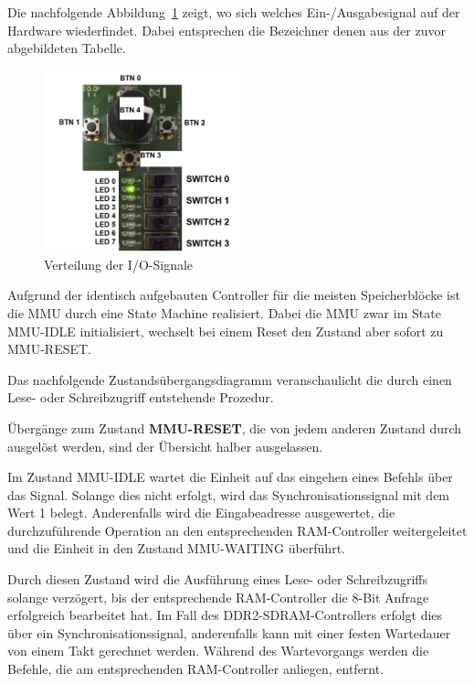 Die nachfolgende Abbildung~\ref{fig:pinning} zeigt, wo sich welches Ein-/Ausgabesignal auf der Hardware wiederfindet. Dabei entsprechen die Bezeichner denen aus der zuvor abgebildeten Tabelle.

\begin{figure}[H]
	\centering
		\includegraphics[width=0.5\textwidth]{pinning.png}
	\caption{Verteilung der I/O-Signale}
	\label{fig:pinning}
\end{figure}



Aufgrund der identisch aufgebauten Controller f\"ur die meisten Speicherbl\"ocke ist die MMU durch eine State Machine realisiert. Dabei die MMU zwar im State MMU-IDLE initialisiert, wechselt bei einem Reset den Zustand aber sofort zu MMU-RESET.

Das nachfolgende Zustands\"ubergangsdiagramm veranschaulicht die durch einen Lese- oder Schreibzugriff entstehende Prozedur.

{\"Uberg\"ange zum Zustand \textbf{MMU-RESET}, die von jedem anderen Zustand durch  ausgel\"ost werden, sind der \"Ubersicht halber ausgelassen.}


Im Zustand MMU-IDLE wartet die Einheit auf das eingehen eines Befehls \"uber das  Signal. Solange dies nicht erfolgt, wird das Synchronisationssignal  mit dem Wert 1 belegt. Anderenfalls wird die Eingabeadresse ausgewertet, die durchzuf\"uhrende Operation an den entsprechenden RAM-Controller weitergeleitet und die Einheit in den Zustand MMU-WAITING \"uberf\"uhrt.


Durch diesen Zustand wird die Ausf\"uhrung eines Lese- oder Schreibzugriffs solange verz\"ogert, bis der entsprechende RAM-Controller die 8-Bit Anfrage erfolgreich bearbeitet hat. Im Fall des DDR2-SDRAM-Controllers erfolgt dies \"uber ein Synchronisationssignal, anderenfalls kann mit einer festen Wartedauer von einem Takt gerechnet werden. W\"ahrend des Wartevorgangs werden die Befehle, die am entsprechenden RAM-Controller anliegen, entfernt.

